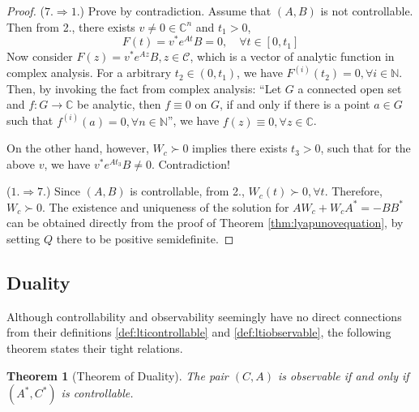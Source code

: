 \documentclass[
]{book}
\newtheorem{theorem}{Theorem}[chapter]
\theoremstyle{definition}
\theoremstyle{definition}
\theoremstyle{definition}
\theoremstyle{definition}
\theoremstyle{remark}
\begin{document}
\begin{proof}
(\(7. \Rightarrow 1.\)) Prove by contradiction. Assume that \((A, B)\) is not controllable. Then from 2., there exists \(v \ne 0 \in \mathbb{C}^n\) and \(t_1 > 0\),
\begin{equation*}
   F(t) = v^* e^{At} B = 0, \quad \forall t \in [0, t_1]
\end{equation*}
Now consider \(F(z) = v^* e^{Az} B, z\in \mathcal{C}\), which is a vector of analytic function in complex analysis. For a arbitrary \(t_2 \in (0, t_1)\), we have \(F^{(i)}(t_2) = 0, \forall i \in \mathbb{N}\). Then, by invoking the fact from complex analysis: ``Let \(G\) a connected open set and \(f: G \rightarrow \mathbb{C}\) be analytic, then \(f \equiv 0\) on \(G\), if and only if there is a point \(a \in G\) such that \(f^{(i)}(a) = 0, \forall n \in \mathbb{N}\)'', we have \(f(z) \equiv 0, \forall z \in \mathbb{C}\).

On the other hand, however, \(W_c \succ 0\) implies there exists \(t_3 > 0\), such that for the above \(v\), we have \(v^* e^{At_3} B \ne 0\). Contradiction!

(\(1. \Rightarrow 7.\)) Since \((A, B)\) is controllable, from 2., \(W_c(t) \succ 0, \forall t\). Therefore, \(W_c \succ 0\). The existence and uniqueness of the solution for \(AW_c + W_cA^* = -BB^*\) can be obtained directly from the proof of Theorem \ref{thm:lyapunovequation}, by setting \(Q\) there to be positive semidefinite.
\end{proof}

\hypertarget{duality}{%
\subsection{Duality}\label{duality}}

Although controllability and observability seemingly have no direct connections from their definitions \ref{def:lticontrollable} and \ref{def:ltiobservable}, the following theorem \citep{chen1984book-linear} states their tight relations.

\begin{theorem}[Theorem of Duality]
\protect\hypertarget{thm:lti-dual-conobs}{}\label{thm:lti-dual-conobs}The pair \((C,A)\) is observable if and only if \((A^*,C^*)\) is controllable.
\end{theorem}
\end{document}
